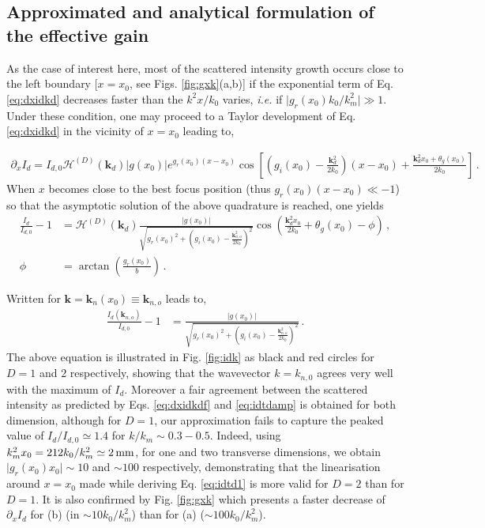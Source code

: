 \documentclass[
 reprint,
 amsmath,amssymb,
 aps,
]{revtex4-1}
\begin{document}
\subsection{Approximated and analytical formulation of the effective gain}
As the  case of interest here,  most of the scattered intensity growth occurs close to the left boundary [$x=x_0$, see Figs. \ref{fig:gxk}(a,b)] if the exponential term of Eq. \eqref{eq:dxidkd}  decreases faster than the $k^2x/k_0$ varies, \emph{i.e.} if $\vert g_r(x_0)k_0/k_m^2\vert  \gg 1$. Under these condition,  one may proceed to a Taylor development of Eq. \eqref{eq:dxidkd} in the vicinity of $x=x_0$ leading to,
\begin{widetext}
\begin{align}
   \partial_x I_d=I_{d,0} \mathcal{H}^{(D)}(\mathbf{k}_d)\vert g(x_0) \vert e^{ g_r(x_0)(x-x_0)} 
    \cos\left[  \left( g_i(x_0) -\frac{\mathbf{k}_d^2 }{2k_0} \right)(x-x_0)  +\frac{\mathbf{k}_d^2x_0 +\theta_g(x_0)}{2k_0}  \right]\, . \label{eq:idtd1}
\end{align}
When  $x$ becomes close to the best focus position (thus $g_r(x_0)(x-x_0)\ll -1$) so that the asymptotic solution of the above quadrature is reached, one yields
\begin{align}
    \frac{I_d}{I_{d,0}}-1& =  \mathcal{H}^{(D)}(\mathbf{k}_d)
   \frac{\vert g(x_0) \vert  }
    {\sqrt{g_r(x_0)^2+\left( g_i(x_0) -\frac{\mathbf{k}_{n,o}^2 }{2k_0}\right)^2}} 
    \cos\left( \frac{\mathbf{k}_d^2x_0 }{2k_0}+\theta_g(x_0) -\phi \right) \, , \nonumber \\
    \phi &= \arctan \left( \frac{g_r(x_0)}{b} \right)\, . \label{eq:idtdf}
\end{align}
\end{widetext}
Written for  $\mathbf{k}=\mathbf{k}_n(x_0)\equiv \mathbf{k}_{n,o}$ leads to,
\begin{align}
    \frac{I_d(\mathbf{k}_{n,o})}{I_{d,0}}-1& =  
   \frac{\vert g(x_0) \vert  }
    {\sqrt{g_r(x_0)^2+\left( g_i(x_0) -\frac{\mathbf{k}_{n,o}^2 }{2k_0}\right)^2}} \, . \label{eq:idtdamp}
\end{align}
The  above equation is illustrated in Fig. \ref{fig:idk} as black and red circles for $D=1$ and $2$ respectively, showing that the wavevector  $k=k_{n,0}$ agrees very well with the maximum of $I_d$. Moreover a fair agreement between  the scattered intensity as predicted by  Eqs. \eqref{eq:dxidkdf}   and  \eqref{eq:idtdamp}  is obtained for both dimension, although for $D=1$, our approximation fails to capture the peaked value of $ I_d/I_{d,0}\simeq 1.4 $ for $k/k_m\sim 0.3-0.5$. 
Indeed, using  $k_m^2x_0=212k_0/k_m^2\simeq 2\,\rm mm$, for  one and  two transverse dimensions,  we obtain  $\vert g_r(x_0)x_0 \vert  \sim 10 $  and $\sim 100$ respectively, demonstrating that the linearisation around $x=x_0$ made  while deriving Eq. \eqref{eq:idtd1} is more valid  for $D=2$ than for  $D=1$. It is also confirmed by Fig. \ref{fig:gxk} which presents a faster decrease of $\partial_x I_d$ for  (b) (in $\sim 10k_0/k_m^2$) than for  (a) ($\sim 100k_0/k_m^2$).
\end{document}
